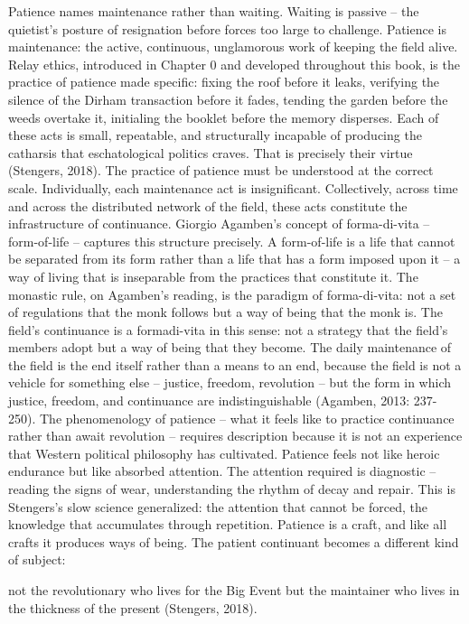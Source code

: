 Patience names maintenance rather than waiting. Waiting is passive – the quietist’s posture of resignation before forces too large to challenge. Patience is maintenance: the active, continuous, unglamorous work of keeping the field alive. Relay ethics, introduced in Chapter 0 and developed throughout this book, is the practice of patience made specific: fixing the roof before it leaks, verifying the silence of the Dirham transaction before it fades, tending the garden before the weeds overtake it, initialing the booklet before the memory disperses. Each of these acts is small, repeatable, and structurally incapable of producing the catharsis that eschatological politics craves. That is precisely their virtue (Stengers, 2018). The practice of patience must be understood at the correct scale. Individually, each maintenance act is insignificant. Collectively, across time and across the distributed network of the field, these acts constitute the infrastructure of continuance. Giorgio Agamben’s concept of forma-di-vita – form-of-life – captures this structure precisely. A form-of-life is a life that cannot be separated from its form rather than a life that has a form imposed upon it – a way of living that is inseparable from the practices that constitute it. The monastic rule, on Agamben’s reading, is the paradigm of forma-di-vita: not a set of regulations that the monk follows but a way of being that the monk is. The field’s continuance is a formadi-vita in this sense: not a strategy that the field’s members adopt but a way of being that they become. The daily maintenance of the field is the end itself rather than a means to an end, because the field is not a vehicle for something else – justice, freedom, revolution – but the form in which justice, freedom, and continuance are indistinguishable (Agamben, 2013: 237-250). The phenomenology of patience – what it feels like to practice continuance rather than await revolution – requires description because it is not an experience that Western political philosophy has cultivated. Patience feels not like heroic endurance but like absorbed attention. The attention required is diagnostic – reading the signs of wear, understanding the rhythm of decay and repair. This is Stengers’s slow science generalized: the attention that cannot be forced, the knowledge that accumulates through repetition. Patience is a craft, and like all crafts it produces ways of being. The patient continuant becomes a different kind of subject:

not the revolutionary who lives for the Big Event but the maintainer who lives in the thickness of the present (Stengers, 2018).

